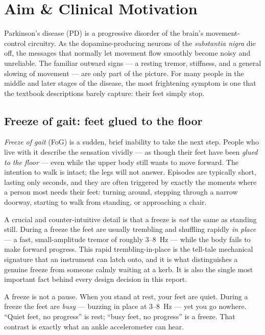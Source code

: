 \section{Aim \& Clinical Motivation}
\label{sec:aim}

Parkinson's disease (PD) is a progressive disorder of the brain's movement-control
circuitry. As the dopamine-producing neurons of the \emph{substantia nigra} die off,
the messages that normally let movement flow smoothly become noisy and unreliable.
The familiar outward signs --- a resting tremor, stiffness, and a general slowing of
movement --- are only part of the picture. For many people in the middle and later
stages of the disease, the most frightening symptom is one that the textbook
descriptions barely capture: their feet simply stop.

\subsection{Freeze of gait: feet glued to the floor}

\emph{Freeze of gait} (FoG) is a sudden, brief inability to take the next step. People
who live with it describe the sensation vividly --- as though their feet have been
\emph{glued to the floor} --- even while the upper body still wants to move forward.
The intention to walk is intact; the legs will not answer. Episodes are typically
short, lasting only seconds, and they are often triggered by exactly the moments where
a person most needs their feet: turning around, stepping through a narrow doorway,
starting to walk from standing, or approaching a chair.

A crucial and counter-intuitive detail is that a freeze is \emph{not} the same as
standing still. During a freeze the feet are usually trembling and shuffling rapidly
\emph{in place} --- a fast, small-amplitude tremor of roughly \SI{3}{}--\SI{8}{\hertz}
--- while the body fails to make forward progress. This rapid trembling-in-place is
the tell-tale mechanical signature that an instrument can latch onto, and it is what
distinguishes a genuine freeze from someone calmly waiting at a kerb. It is also the
single most important fact behind every design decision in this report.

\begin{intuition}
A freeze is not a pause. When you stand at rest, your feet are quiet. During a freeze
the feet are \emph{busy} --- buzzing in place at \SI{3}{}--\SI{8}{\hertz} --- yet you
go nowhere. ``Quiet feet, no progress'' is rest; ``busy feet, no progress'' is a
freeze. That contrast is exactly what an ankle accelerometer can hear.
\end{intuition}

